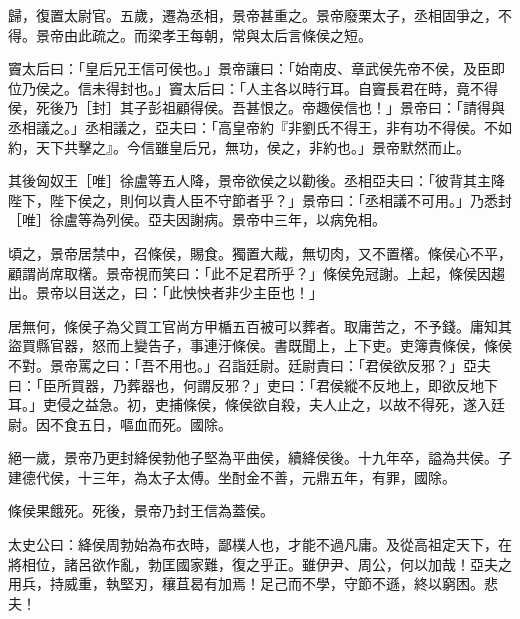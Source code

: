 \begin{pinyinscope}
歸，復置太尉官。五歲，遷為丞相，景帝甚重之。景帝廢栗太子，丞相固爭之，不得。景帝由此疏之。而梁孝王每朝，常與太后言條侯之短。

竇太后曰：「皇后兄王信可侯也。」景帝讓曰：「始南皮、章武侯先帝不侯，及臣即位乃侯之。信未得封也。」竇太后曰：「人主各以時行耳。自竇長君在時，竟不得侯，死後乃［封］其子彭祖顧得侯。吾甚恨之。帝趣侯信也！」景帝曰：「請得與丞相議之。」丞相議之，亞夫曰：「高皇帝約『非劉氏不得王，非有功不得侯。不如約，天下共擊之』。今信雖皇后兄，無功，侯之，非約也。」景帝默然而止。

其後匈奴王［唯］徐盧等五人降，景帝欲侯之以勸後。丞相亞夫曰：「彼背其主降陛下，陛下侯之，則何以責人臣不守節者乎？」景帝曰：「丞相議不可用。」乃悉封［唯］徐盧等為列侯。亞夫因謝病。景帝中三年，以病免相。

頃之，景帝居禁中，召條侯，賜食。獨置大胾，無切肉，又不置櫡。條侯心不平，顧謂尚席取櫡。景帝視而笑曰：「此不足君所乎？」條侯免冠謝。上起，條侯因趨出。景帝以目送之，曰：「此怏怏者非少主臣也！」

居無何，條侯子為父買工官尚方甲楯五百被可以葬者。取庸苦之，不予錢。庸知其盜買縣官器，怒而上變告子，事連汙條侯。書既聞上，上下吏。吏簿責條侯，條侯不對。景帝罵之曰：「吾不用也。」召詣廷尉。廷尉責曰：「君侯欲反邪？」亞夫曰：「臣所買器，乃葬器也，何謂反邪？」吏曰：「君侯縱不反地上，即欲反地下耳。」吏侵之益急。初，吏捕條侯，條侯欲自殺，夫人止之，以故不得死，遂入廷尉。因不食五日，嘔血而死。國除。

絕一歲，景帝乃更封絳侯勃他子堅為平曲侯，續絳侯後。十九年卒，謚為共侯。子建德代侯，十三年，為太子太傅。坐酎金不善，元鼎五年，有罪，國除。

條侯果餓死。死後，景帝乃封王信為蓋侯。

太史公曰：絳侯周勃始為布衣時，鄙樸人也，才能不過凡庸。及從高祖定天下，在將相位，諸呂欲作亂，勃匡國家難，復之乎正。雖伊尹、周公，何以加哉！亞夫之用兵，持威重，執堅刃，穰苴曷有加焉！足己而不學，守節不遜，終以窮困。悲夫！


\end{pinyinscope}